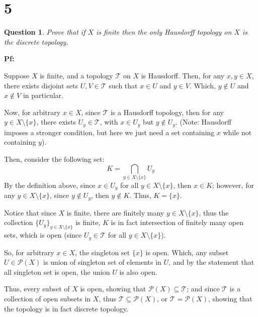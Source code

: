 \documentclass{article}
\newtheorem{question}{Question}
\begin{document}
\hfill

\section*{5}
\begin{question}
    Prove that if $X$ is finite then the only Hausdorff topology on $X$ is the discrete topology.
\end{question}

\textbf{Pf:}

Suppose $X$ is finite, and a topology $\mathcal{T}$ on $X$ is Hausdorff. Then, for any $x,y\in X$, there exists disjoint sets $U,V\in\mathcal{T}$
such that $x\in U$ and $y\in V$. Which, $y\notin U$ and $x\notin V$ in particular.

Now, for arbitrary $x\in X$, since $\mathcal{T}$ is a Hausdorff topology, then for any $y\in X\setminus\{x\}$, there exists $U_y\in \mathcal{T}$,
with $x\in U_y$ but $y\notin U_y$. (Note: Hausdorff imposes a stronger condition, but here we just need a set containing $x$ while not containing $y$).

\hfill

Then, consider the following set:
$$K=\bigcap_{y\in X\setminus\{x\}}U_y$$
By the definition above, since $x\in U_y$ for all $y\in X\setminus\{x\}$, then $x\in K$;
however, for any $y\in X\setminus\{x\}$, since $y\notin U_y$, then $y\notin K$. Thus, $K=\{x\}$.

Notice that since $X$ is finite, there are finitely many $y\in X\setminus\{x\}$, thus the collection $\{U_y\}_{y\in X\setminus\{x\}}$ is finite,
$K$ is in fact intersection of finitely many open sets, which is open (since $U_y\in \mathcal{T}$ for all $y\in X\setminus\{x\}$).

So, for arbitrary $x\in X$, the singleton set $\{x\}$ is open. Which, any subset $U\in \mathcal{P}(X)$ is union of singleton set of elements in $U$,
and by the statement that all singleton set is open, the union $U$ is also open.

\hfill

Thus, every subset of $X$ is open, showing that $\mathcal{P}(X)\subseteq \mathcal{T}$; and since $\mathcal{T}$ is a collection of open subsets in $X$, 
thus $\mathcal{T}\subseteq \mathcal{P}(X)$, or $\mathcal{T}=\mathcal{P}(X)$, showing that the topology is in fact discrete topology.
\end{document}
